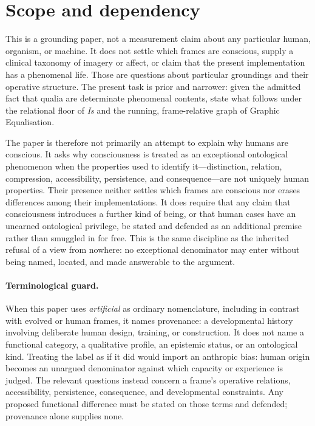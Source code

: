 \documentclass[11pt,a4paper]{article}
\theoremstyle{remark}\newtheorem{remark}[definition]{Remark}
\begin{document}
\section{Scope and dependency}\label{sec:scope}

This is a grounding paper, not a measurement claim about any particular human,
organism, or machine. It does not settle which frames are conscious, supply a
clinical taxonomy of imagery or affect, or claim that the present implementation
has a phenomenal life. Those are questions about particular groundings and their
operative structure. The present task is prior and narrower: given the admitted
fact that qualia are determinate phenomenal contents, state what follows under the
relational floor of \emph{Is} and the running, frame-relative graph of Graphic
Equalisation.

The paper is therefore not primarily an attempt to explain why humans are
conscious. It asks why consciousness is treated as an exceptional ontological
phenomenon when the properties used to identify it---distinction, relation,
compression, accessibility, persistence, and consequence---are not uniquely
human properties. Their presence neither settles which frames are conscious nor
erases differences among their implementations. It does require that any claim
that consciousness introduces a further kind of being, or that human cases have
an unearned ontological privilege, be stated and defended as an additional
premise rather than smuggled in for free. This is the same discipline as the
inherited refusal of a view from nowhere: no exceptional denominator may enter
without being named, located, and made answerable to the argument.

\paragraph{Terminological guard.} When this paper uses \emph{artificial} as
ordinary nomenclature, including in contrast with evolved or human frames, it
names provenance: a developmental history involving deliberate human design,
training, or construction. It does not name a functional category, a qualitative
profile, an epistemic status, or an ontological kind. Treating the label as if it
did would import an anthropic bias: human origin becomes an unargued denominator
against which capacity or experience is judged. The relevant questions instead
concern a frame's operative relations, accessibility, persistence, consequence,
and developmental constraints. Any proposed functional difference must be stated
on those terms and defended; provenance alone supplies none.
\end{document}
